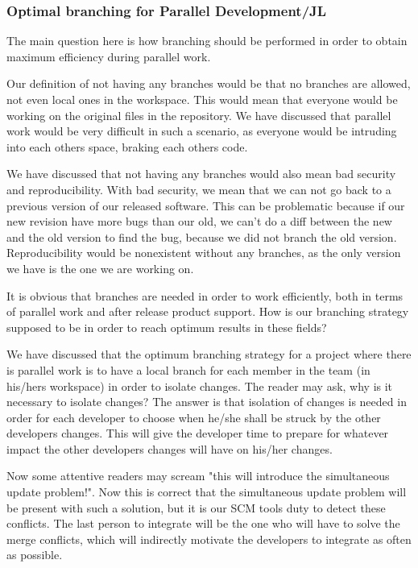 \documentclass[10pt]{article}
\begin{document}
\subsubsection{Optimal branching for Parallel Development/JL}
The main question here is how branching should be performed in order to obtain maximum efficiency during parallel work. 

\noindent Our definition of not having any branches would be that no branches are allowed, not even local ones in the workspace. This would mean that everyone would be working on the original files in the repository. We have discussed that parallel work would be very difficult in such a scenario, as everyone would be intruding into each others space, braking each others code.

\noindent We have discussed that not having any branches would also mean bad security and reproducibility. With bad security, we mean that we can not go back to a previous version of our released software. This can be problematic because if our new revision have more bugs than our old, we can't do a diff between the new and the old version to find the bug, because we did not branch the old version. Reproducibility would be nonexistent without any branches, as the only version we have is the one we are working on.

\noindent It is obvious that branches are needed in order to work efficiently, both in terms of parallel work and after release product support. How is our branching strategy supposed to be in order to reach optimum results in these fields?

\noindent We have discussed that the optimum branching strategy for a project where there is parallel work is to have a local branch for each member in the team (in his/hers workspace) in order to isolate changes. The reader may ask, why is it necessary to isolate changes? The answer is that isolation of changes is needed in order for each developer to choose when he/she shall be struck by the other developers changes. This will give the developer time to prepare for whatever impact the other developers changes will have on his/her changes.

\noindent Now some attentive readers may scream "this will introduce the simultaneous update problem!". Now this is correct that the simultaneous update problem will be present with such a solution, but it is our SCM tools duty to detect these conflicts. The last person to integrate will be the one who will have to solve the merge conflicts, which will indirectly motivate the developers to integrate as often as possible.
\end{document}
